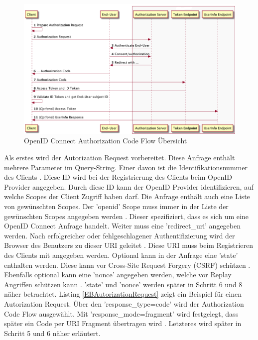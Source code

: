 
\begin{figure}[!ht]
	\centering
	\includegraphics[width=1\textwidth]{Images/Ebert/AuthorizationCodeFlow.png}
	\caption{OpenID Connect Authorization Code Flow Übersicht \cite{EB12}}
	\label{fig:EB_AuthorizationCodeFlow}
\end{figure} 

Als erstes wird der Autorization Request vorbereitet. Diese Anfrage enthält mehrere Parameter im Query-String. Einer davon ist die Identifikationsnummer des Clients \cite{EB14}. Diese ID wird bei der Registrierung des Clients beim OpenID Provider angegeben. Durch diese ID kann der OpenID Provider identifizieren, auf welche Scopes der Client Zugriff haben darf. Die Anfrage enthält auch eine Liste von gewünschten Scopes. Der 'openid' Scope muss immer in der Liste der gewünschten Scopes angegeben werden \cite{EB14}. Dieser spezifiziert, dass es sich um eine OpenID Connect Anfrage handelt. Weiter muss eine 'redirect\_uri' angegeben werden. Nach erfolgreicher oder fehlgeschlagener Authentifizierung wird der Browser des Benutzers zu dieser URI geleitet \cite{EB14}. Diese URI muss beim Registrieren des Clients mit angegeben werden. Optional kann in der Anfrage eine 'state' enthalten werden. Diese kann vor Cross-Site Request Forgery (CSRF) schützen \cite{EB14}. Ebenfalls optional kann eine 'nonce' angegeben werden, welche vor Replay Angriffen schützen kann \cite{EB14}. 'state' und 'nonce' werden später in Schritt 6 und 8 näher betrachtet. Listing \ref{EBAutorizationRequest} zeigt ein Beispiel für einen Autorization Request. Über den 'response\_type=code' wird der Authorization Code Flow ausgewählt. Mit 'response\_mode=fragment' wird festgelegt, dass später ein Code per URI Fragment übertragen wird \cite{EB64}. Letzteres wird später in Schritt 5 und 6 näher erläutert.

